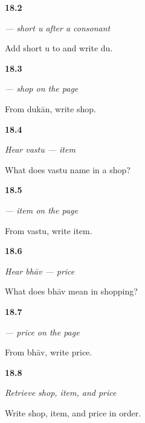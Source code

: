 \noindent\begin{minipage}[t]{\linewidth}
\raggedright
\hypertarget{review-MW-W13-u-matra-write}{\textbf{18.2}} \emph{ — short \emph{u} after a consonant}\par
\small Add short u to  and write du.
\end{minipage}\par\medskip

\noindent\begin{minipage}[t]{\linewidth}
\raggedright
\hypertarget{review-MW-C13-dukan-dictation}{\textbf{18.3}} \emph{ — shop on the page}\par
\small From dukān, write shop.
\end{minipage}\par\medskip

\noindent\begin{minipage}[t]{\linewidth}
\raggedright
\hypertarget{review-MW-C13-hear-vastu-meaning}{\textbf{18.4}} \emph{Hear \emph{vastu} — item}\par
\small What does vastu name in a shop?
\end{minipage}\par\medskip

\noindent\begin{minipage}[t]{\linewidth}
\raggedright
\hypertarget{review-MW-C13-vastu-dictation}{\textbf{18.5}} \emph{ — item on the page}\par
\small From vastu, write item.
\end{minipage}\par\medskip

\noindent\begin{minipage}[t]{\linewidth}
\raggedright
\hypertarget{review-MW-C13-hear-bhaav-meaning}{\textbf{18.6}} \emph{Hear \emph{bhāv} — price}\par
\small What does bhāv mean in shopping?
\end{minipage}\par\medskip

\noindent\begin{minipage}[t]{\linewidth}
\raggedright
\hypertarget{review-MW-C13-bhaav-dictation}{\textbf{18.7}} \emph{ — price on the page}\par
\small From bhāv, write price.
\end{minipage}\par\medskip

\noindent\begin{minipage}[t]{\linewidth}
\raggedright
\hypertarget{review-MW-R13-shopping-three-recall}{\textbf{18.8}} \emph{Retrieve shop, item, and price}\par
\small Write shop, item, and price in order.
\end{minipage}\par\medskip

